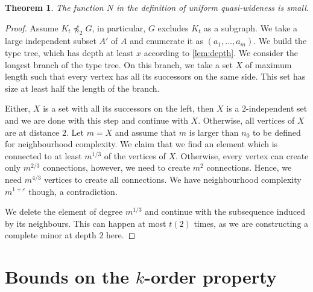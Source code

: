 \documentclass[11pt, fleqn]{article}
\theoremstyle{plain}
\newtheorem{theorem}{Theorem}
\theoremstyle{nonumberplain}
\newtheorem{proof}{Proof.}
\renewcommand{\epsilon}{\varepsilon}
\newcommand{\minor}{\preccurlyeq}
\begin{document}
\begin{theorem}
The function $N$ in the definition of uniform quasi-wideness
is small.
\end{theorem}
\begin{proof}
Assume $K_t\not\minor_2G$, in particular, $G$ excludes $K_t$
as a subgraph. We take a large independent subset $A'$ of $A$ and
enumerate it as $(a_1,\ldots, a_m)$. We build the type
tree, which has depth at least $x$ according to \cref{lem:depth}. 
We consider the longest branch of the type tree. On this branch, 
we take a set $X$ of maximum length such that every vertex has 
all its successors on the same side. This set has size at least
half the length of the branch. 

Either, $X$ is a set with all its successors on the left, then $X$ 
is a $2$-independent set and we are done with this step and
continue with $X$. Otherwise, all vertices of $X$ are at distance
$2$. Let $m=X$ and assume that $m$ is larger than $n_0$ to
be defined for neighbourhood complexity.
We claim that we find an element which is connected to at least $m^{1/3}$
of the vertices of $X$. Otherwise, every vertex
can create only $m^{2/3}$ connections, however, we need
to create $m^2$ connections. Hence, we need $m^{4/3}$ vertices
to create all connections. We have neighbourhood complexity
$m^{1+\epsilon}$ though, a contradiction. 

We delete the element of degree $m^{1/3}$ 
and continue with the subsequence
induced by its neighbours. This can happen at most 
$t(2)$ times, as we are constructing a complete minor at 
depth $2$ here. 
\end{proof}



\section{Bounds on the $k$-order property}\label{sec:stable}
\end{document}
